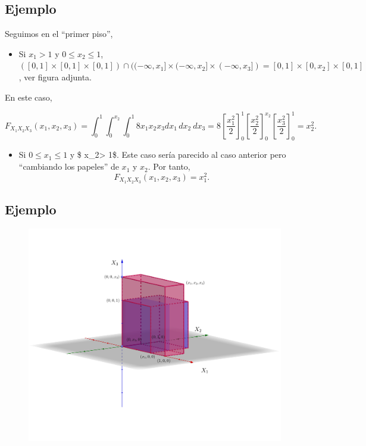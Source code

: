\documentclass[]{book}
\providecommand{\tightlist}{%
  \setlength{\itemsep}{0pt}\setlength{\parskip}{0pt}}
\begin{document}
\hypertarget{ejemplo-109}{%
\subsection{Ejemplo}\label{ejemplo-109}}

Seguimos en el ``primer piso'',

\begin{itemize}
\tightlist
\item
  Si \(x_1 >1\) y \(0\leq x_2\leq 1\), \(([0,1]\times [0,1]\times [0,1])\cap ((-\infty,x_1]\times (-\infty,x_2]\times (-\infty,x_3])=[0,1]\times [0,x_2]\times [0,1]\), ver figura adjunta.
\end{itemize}

En este caso,

\[
F_{X_1X_2X_3}(x_1,x_2,x_3)=\int_{0}^{1}\int_{0}^{x_2}\int_{0}^{1} 8 x_1 x_2 x_3 dx_1\, dx_2\ dx_3 = 
8\left[\frac{x_1^2}{2}\right]_0^{1}\left[\frac{x_2^2}{2}\right]_0^{x_2}\left[\frac{x_3^2}{2}\right]_0^{1} = x_2^2.
\]

\begin{itemize}
\tightlist
\item
  Si \(0\leq x_1 \leq 1\) y \$ x\_2\textgreater{} 1\$. Este caso sería parecido al caso anterior pero ``cambiando los papeles'' de \(x_1\) y \(x_2\).
  Por tanto,
  \[
  F_{X_1X_2X_3}(x_1,x_2,x_3)=x_1^2.
  \]
\end{itemize}

\hypertarget{ejemplo-110}{%
\subsection{Ejemplo}\label{ejemplo-110}}

\begin{figure}
\includegraphics[width=800px]{Images/Fx1x2x3pisox1} \end{figure}
\end{document}
